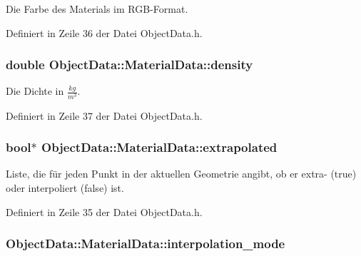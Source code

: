 Die Farbe des Materials im R\-G\-B-\/\-Format. 



Definiert in Zeile 36 der Datei Object\-Data.\-h.

\hypertarget{structObjectData_1_1MaterialData_a49cbca11f42993f41497e725fe8ca68c}{
\subsubsection[{density}]{\setlength{\rightskip}{0pt plus 5cm}double Object\-Data\-::\-Material\-Data\-::density}}\label{structObjectData_1_1MaterialData_a49cbca11f42993f41497e725fe8ca68c}


Die Dichte in $\frac{kg}{m^3}$. 



Definiert in Zeile 37 der Datei Object\-Data.\-h.

\hypertarget{structObjectData_1_1MaterialData_a22bff8a90f617a5485690bd017dcf701}{
\subsubsection[{extrapolated}]{\setlength{\rightskip}{0pt plus 5cm}bool$\ast$ Object\-Data\-::\-Material\-Data\-::extrapolated}}\label{structObjectData_1_1MaterialData_a22bff8a90f617a5485690bd017dcf701}


Liste, die für jeden Punkt in der aktuellen Geometrie angibt, ob er extra-\/ (true) oder interpoliert (false) ist. 



Definiert in Zeile 35 der Datei Object\-Data.\-h.

\hypertarget{structObjectData_1_1MaterialData_a35d4f03b3af4349f69d5fed072118dca}{
\subsubsection[{interpolation\-\_\-mode}]{ Object\-Data\-::\-Material\-Data\-::interpolation\-\_\-mode}}\label{structObjectData_1_1MaterialData_a35d4f03b3af4349f69d5fed072118dca}


